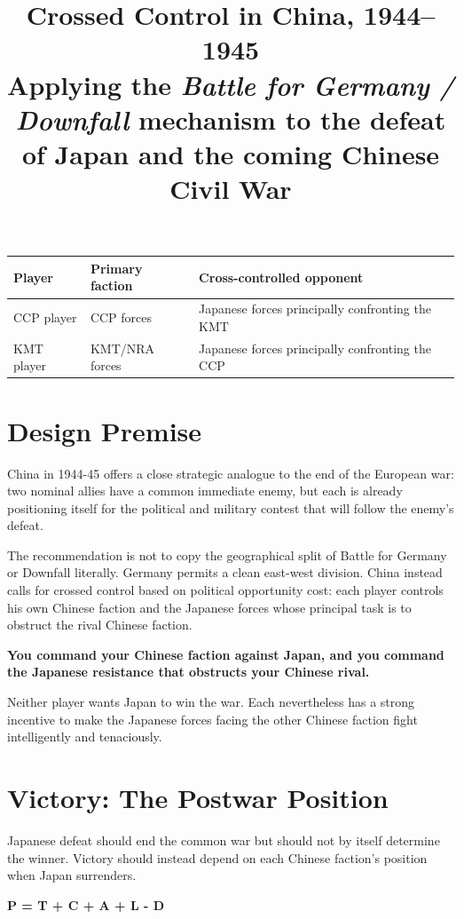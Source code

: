\documentclass[11pt]{article}
\title{\textbf{Crossed Control in China, 1944--1945}\\
\large Applying the \emph{Battle for Germany / Downfall} mechanism to the defeat of Japan and the coming Chinese Civil War}
\author{}
\date{}
\begin{document}
\maketitle

\begin{center}
\begin{tabular}{lll}
\toprule
Player & Primary faction & Cross-controlled opponent \\
\midrule
CCP player & CCP forces & Japanese forces principally confronting the KMT \\
KMT player & KMT/NRA forces & Japanese forces principally confronting the CCP \\
\bottomrule
\end{tabular}
\end{center}

\section{Design Premise}
China in 1944-45 offers a close strategic analogue to the end of the European war: two nominal allies have a common immediate enemy, but each is already positioning itself for the political and military contest that will follow the enemy's defeat.


The recommendation is not to copy the geographical split of Battle for Germany or Downfall literally. Germany permits a clean east-west division. China instead calls for crossed control based on political opportunity cost: each player controls his own Chinese faction and the Japanese forces whose principal task is to obstruct the rival Chinese faction.


\textbf{You command your Chinese faction against Japan, and you command the Japanese resistance that obstructs your Chinese rival.}


Neither player wants Japan to win the war. Each nevertheless has a strong incentive to make the Japanese forces facing the other Chinese faction fight intelligently and tenaciously.


\section{Victory: The Postwar Position}
Japanese defeat should end the common war but should not by itself determine the winner. Victory should instead depend on each Chinese faction's position when Japan surrenders.


\textbf{P = T + C + A + L - D}
\end{document}
